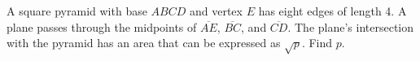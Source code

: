A square pyramid with base $ABCD$ and vertex $E$ has eight edges of length 4.  A plane passes through the midpoints of $\overline{AE}$, $\overline{BC}$, and $\overline{CD}$.  The plane's intersection with the pyramid has an area that can be expressed as $\sqrt{p}$.  Find $p$.